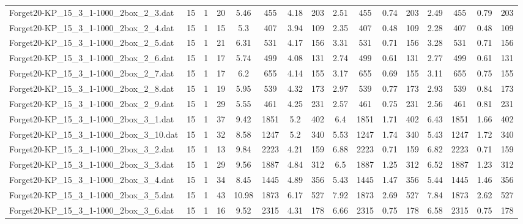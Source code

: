 \begin{sidewaystable}[!ht]
{\begin{tabular}{lccccccccccccccc}
Forget20-KP\_15\_3\_1-1000\_2box\_2\_3.dat & 15 & 1 & 20 & 5.46 & 455 & 4.18 & 203 & 2.51 & 455 & 0.74 & 203 & 2.49 & 455 & 0.79 & 203 \\
Forget20-KP\_15\_3\_1-1000\_2box\_2\_4.dat & 15 & 1 & 15 & 5.3 & 407 & 3.94 & 109 & 2.35 & 407 &  \textcolor{blue2}{0.48} & 109 & 2.28 & 407 &  \textcolor{blue2}{0.48} & 109 \\
Forget20-KP\_15\_3\_1-1000\_2box\_2\_5.dat & 15 & 1 & 21 & 6.31 & 531 & 4.17 & 156 & 3.31 & 531 & 0.71 & 156 & 3.28 & 531 & 0.71 & 156 \\
Forget20-KP\_15\_3\_1-1000\_2box\_2\_6.dat & 15 & 1 & 17 & 5.74 & 499 & 4.08 & 131 & 2.74 & 499 & 0.61 & 131 & 2.77 & 499 & 0.61 & 131 \\
Forget20-KP\_15\_3\_1-1000\_2box\_2\_7.dat & 15 & 1 & 17 & 6.2 & 655 & 4.14 & 155 & 3.17 & 655 &  \textcolor{blue2}{0.69} & 155 & 3.11 & 655 & 0.75 & 155 \\
Forget20-KP\_15\_3\_1-1000\_2box\_2\_8.dat & 15 & 1 & 19 & 5.95 & 539 & 4.32 & 173 & 2.97 & 539 &  \textcolor{blue2}{0.77} & 173 & 2.93 & 539 & 0.84 & 173 \\
Forget20-KP\_15\_3\_1-1000\_2box\_2\_9.dat & 15 & 1 & 29 & 5.55 & 461 & 4.25 & 231 & 2.57 & 461 &  \textcolor{blue2}{0.75} & 231 & 2.56 & 461 & 0.81 & 231 \\
Forget20-KP\_15\_3\_1-1000\_2box\_3\_1.dat & 15 & 1 & 37 & 9.42 & 1851 & 5.2 & 402 & 6.4 & 1851 & 1.71 & 402 & 6.43 & 1851 &  \textcolor{blue2}{1.66} & 402 \\
Forget20-KP\_15\_3\_1-1000\_2box\_3\_10.dat & 15 & 1 & 32 & 8.58 & 1247 & 5.2 & 340 & 5.53 & 1247 & 1.74 & 340 & 5.43 & 1247 & 1.72 & 340 \\
Forget20-KP\_15\_3\_1-1000\_2box\_3\_2.dat & 15 & 1 & 13 & 9.84 & 2223 & 4.21 & 159 & 6.88 & 2223 &  \textcolor{blue2}{0.71} & 159 & 6.82 & 2223 &  \textcolor{blue2}{0.71} & 159 \\
Forget20-KP\_15\_3\_1-1000\_2box\_3\_3.dat & 15 & 1 & 29 & 9.56 & 1887 & 4.84 & 312 & 6.5 & 1887 & 1.25 & 312 & 6.52 & 1887 &  \textcolor{blue2}{1.23} & 312 \\
Forget20-KP\_15\_3\_1-1000\_2box\_3\_4.dat & 15 & 1 & 34 & 8.45 & 1445 & 4.89 & 356 & 5.43 & 1445 & 1.47 & 356 & 5.44 & 1445 & 1.46 & 356 \\
Forget20-KP\_15\_3\_1-1000\_2box\_3\_5.dat & 15 & 1 & 43 & 10.98 & 1873 & 6.17 & 527 & 7.92 & 1873 & 2.69 & 527 & 7.84 & 1873 & 2.62 & 527 \\
Forget20-KP\_15\_3\_1-1000\_2box\_3\_6.dat & 15 & 1 & 16 & 9.52 & 2315 & 4.31 & 178 & 6.66 & 2315 &  \textcolor{blue2}{0.75} & 178 & 6.58 & 2315 &  \textcolor{blue2}{0.75} & 178 \\

\end{tabular}}
\end{sidewaystable}
